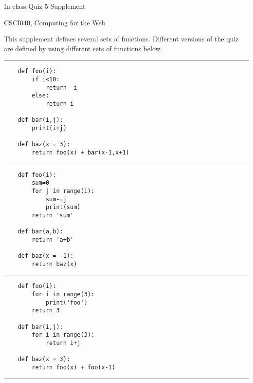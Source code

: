 \documentclass[10pt]{article}
\theoremstyle{definition}
\begin{document}
\newpage

\begin{center}
    {
\Large
In-class Quiz 5 Supplement
}

    \vspace{0.1in}
CSCI040, Computing for the Web

    \vspace{0.1in}
\end{center}

This supplement defines several sets of functions.
Different versions of the quiz are defined by using different sets of functions below.

\noindent
\rule{\textwidth}{0.1pt}

\begin{lstlisting}
    def foo(i):
        if i<10:
            return -i
        else: 
            return i

    def bar(i,j):
        print(i+j)

    def baz(x = 3):
        return foo(x) + bar(x-1,x+1)
\end{lstlisting}

\noindent
\rule{\textwidth}{0.1pt}

\begin{lstlisting}
    def foo(i):
        sum=0
        for j in range(i):
            sum-=j
            print(sum)
        return 'sum'

    def bar(a,b):
        return 'a+b'

    def baz(x = -1):
        return baz(x)
\end{lstlisting}

\noindent
\rule{\textwidth}{0.1pt}

\begin{lstlisting}
    def foo(i):
        for i in range(3):
            print('foo')
        return 3

    def bar(i,j):
        for i in range(3):
            return i+j

    def baz(x = 3):
        return foo(x) + foo(x-1)
\end{lstlisting}

\noindent
\rule{\textwidth}{0.1pt}
\end{document}
